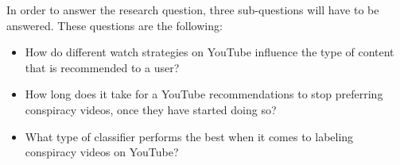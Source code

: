 \documentclass[../main.tex]{subfiles}
\begin{document}
In order to answer the research question, three sub-questions will have to be answered. These questions are the following:
\begin{itemize}
    \item How do different watch strategies on YouTube influence the type of content that is recommended to a user?
    \item How long does it take for a YouTube recommendations to stop preferring conspiracy videos, once they have started doing so?
    \item What type of classifier performs the best when it comes to labeling conspiracy videos on YouTube?
\end{itemize}
\end{document}
